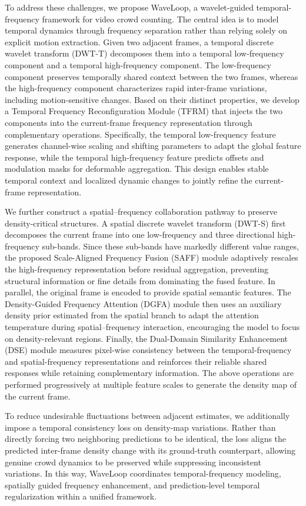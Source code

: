 \documentclass[lettersize,journal]{IEEEtran}
\begin{document}
To address these challenges, we propose WaveLoop, a wavelet-guided temporal-frequency framework for video crowd counting. The central idea is to model temporal dynamics through frequency separation rather than relying solely on explicit motion extraction. Given two adjacent frames, a temporal discrete wavelet transform (DWT-T) decomposes them into a temporal low-frequency component and a temporal high-frequency component. The low-frequency component preserves temporally shared context between the two frames, whereas the high-frequency component characterizes rapid inter-frame variations, including motion-sensitive changes. Based on their distinct properties, we develop a Temporal Frequency Reconfiguration Module (TFRM) that injects the two components into the current-frame frequency representation through complementary operations. Specifically, the temporal low-frequency feature generates channel-wise scaling and shifting parameters to adapt the global feature response, while the temporal high-frequency feature predicts offsets and modulation masks for deformable aggregation. This design enables stable temporal context and localized dynamic changes to jointly refine the current-frame representation.

We further construct a spatial--frequency collaboration pathway to preserve density-critical structures. A spatial discrete wavelet transform (DWT-S) first decomposes the current frame into one low-frequency and three directional high-frequency sub-bands. Since these sub-bands have markedly different value ranges, the proposed Scale-Aligned Frequency Fusion (SAFF) module adaptively rescales the high-frequency representation before residual aggregation, preventing structural information or fine details from dominating the fused feature. In parallel, the original frame is encoded to provide spatial semantic features. The Density-Guided Frequency Attention (DGFA) module then uses an auxiliary density prior estimated from the spatial branch to adapt the attention temperature during spatial--frequency interaction, encouraging the model to focus on density-relevant regions. Finally, the Dual-Domain Similarity Enhancement (DSE) module measures pixel-wise consistency between the temporal-frequency and spatial-frequency representations and reinforces their reliable shared responses while retaining complementary information. The above operations are performed progressively at multiple feature scales to generate the density map of the current frame.

To reduce undesirable fluctuations between adjacent estimates, we additionally impose a temporal consistency loss on density-map variations. Rather than directly forcing two neighboring predictions to be identical, the loss aligns the predicted inter-frame density change with its ground-truth counterpart, allowing genuine crowd dynamics to be preserved while suppressing inconsistent variations. In this way, WaveLoop coordinates temporal-frequency modeling, spatially guided frequency enhancement, and prediction-level temporal regularization within a unified framework.
\end{document}
